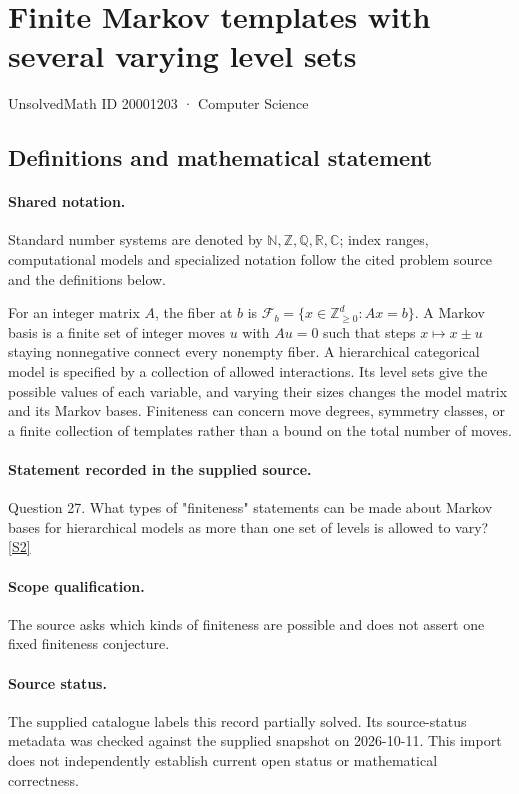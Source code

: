 \documentclass[11pt]{article}
\newcommand{\sref}[2]{\hyperlink{source:#1:#2}{[S#2]}}
\begin{document}
\setcounter{section}{20001202}
\section{Finite Markov templates with several varying level sets}\label{20001203}
{\small\sffamily UnsolvedMath ID 20001203 · Computer Science}
\subsection{Definitions and mathematical statement}

\paragraph{Shared notation.}Standard number systems are denoted by $\mathbb N,\mathbb Z,\mathbb Q,\mathbb R,\mathbb C$; index ranges, computational models and specialized notation follow the cited problem source and the definitions below.


For an integer matrix $A$, the fiber at $b$ is $\mathcal F_b=\{x\in\mathbb Z_{\ge0}^d:Ax=b\}$. A Markov basis is a finite set of integer moves $u$ with $Au=0$ such that steps $x\mapsto x\pm u$ staying nonnegative connect every nonempty fiber. A hierarchical categorical model is specified by a collection of allowed interactions. Its level sets give the possible values of each variable, and varying their sizes changes the model matrix and its Markov bases. Finiteness can concern move degrees, symmetry classes, or a finite collection of templates rather than a bound on the total number of moves.
\paragraph{Statement recorded in the supplied source.}
Question 27. What types of "finiteness" statements can be made about Markov bases for hierarchical models as more than one set of levels is allowed to vary? \sref{20001203}{2}
\paragraph{Scope qualification.}
The source asks which kinds of finiteness are possible and does not assert one fixed finiteness conjecture.
\paragraph{Source status.}
The supplied catalogue labels this record partially solved. Its source-status metadata was checked against the supplied snapshot on 2026-10-11. This import does not independently establish current open status or mathematical correctness.
\end{document}
